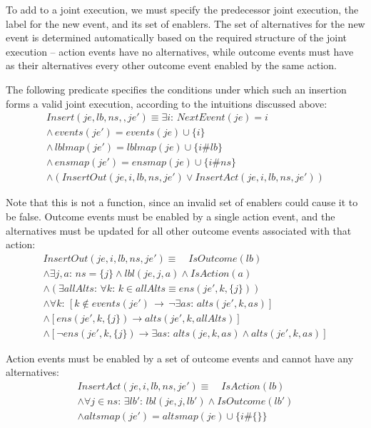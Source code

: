 To add to a joint execution, we must specify the predecessor joint
execution, the label for the new event, and its set of enablers. The
set of alternatives for the new event is determined automatically
based on the required structure of the joint execution -- action events
have no alternatives, while outcome events must have as their alternatives
every other outcome event enabled by the same action.

The following predicate specifies the conditions under which such
an insertion forms a valid joint execution, according to the intuitions
discussed above:\begin{gather*}
Insert(je,lb,ns,,je')\equiv\exists i:\, NextEvent(je)=i\\
\wedge\, events(je')=events(je)\cup\{i\}\\
\wedge\, lblmap(je')=lblmap(je)\cup\{i\#lb\}\\
\wedge\, ensmap(je')=ensmap(je)\cup\{i\#ns\}\\
\wedge\left(InsertOut(je,i,lb,ns,je')\vee InsertAct(je,i,lb,ns,je')\right)\end{gather*}


Note that this is not a function, since an invalid set of enablers
could cause it to be false. Outcome events must be enabled by a single
action event, and the alternatives must be updated for all other outcome
events associated with that action:\begin{gather*}
InsertOut(je,i,lb,ns,je')\equiv\,\,\,\,\,\, IsOutcome(lb)\\
\wedge\exists j,a:\, ns=\{j\}\wedge lbl(je,j,a)\wedge IsAction(a)\\
\wedge\left(\exists allAlts:\,\forall k:\, k\in allAlts\equiv ens(je',k,\{j\})\right)\\
\wedge\forall k:\,\left[k\not\in events(je')\,\rightarrow\,\neg\exists as:\, alts(je',k,as)\right]\\
\wedge\left[ens(je',k,\{j\})\rightarrow alts(je',k,allAlts)\right]\\
\wedge\left[\neg ens(je',k,\{j\})\rightarrow\exists as:\, alts(je,k,as)\wedge alts(je',k,as)\right]\end{gather*}


Action events must be enabled by a set of outcome events and cannot
have any alternatives:\begin{gather*}
InsertAct(je,i,lb,ns,je')\equiv\,\,\,\,\,\, IsAction(lb)\\
\wedge\forall j\in ns:\,\exists lb':\, lbl(je,j,lb')\wedge IsOutcome(lb')\\
\wedge altsmap(je')=altsmap(je)\cup\{i\#\{\}\}\end{gather*}


